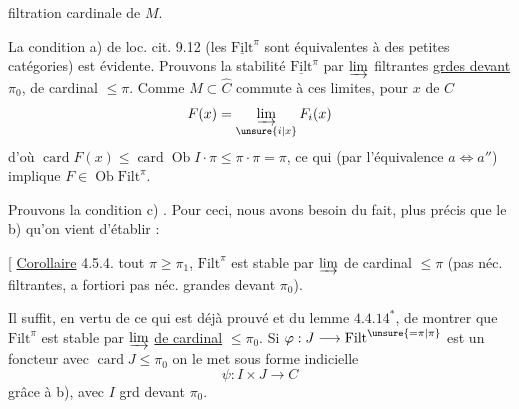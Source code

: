 filtration cardinale de $M$.

La condition a) de loc. cit. 9.12 (les $\underline{\mathrm{Filt}}^\pi$ sont équivalentes à des petites catégories) est évidente. Prouvons  la stabilité  $\underline{\mathrm{Filt}}^\pi$ par $\varinjlim$ filtrantes  \uline{grdes devant $\pi_0$}, de cardinal $\leq\pi$.
Comme $M\subset \widehat C$  commute à ces limites,  pour $x$ de $C$
\[ F(x)=\varinjlim_{\unsure{i|x}} F_i(x) \]
d'où $\operatorname{card}F(x)\leq\operatorname{card}\operatorname{Ob} I\cdot\pi\leq\pi\cdot\pi=\pi$, ce qui (par l'équivalence $a\Longleftrightarrow a''$) implique $F\in\operatorname{Ob}\mathrm{Filt}^\pi$.

Prouvons la condition c) . Pour ceci, nous avons besoin du fait,  plus précis que le b) qu'on vient d'établir :

[ \uline{Corollaire} 4.5.4.   tout $\pi\geq\pi_1$, $\mathrm{Filt}^\pi$  est stable par $\varinjlim$ de cardinal $\leq\pi$ (pas néc. filtrantes, a fortiori pas néc. grandes devant $\pi_0$).

Il suffit,  en vertu de ce qui est déjà prouvé et du lemme $4.4.14^{\ast}$, de montrer que $\mathrm{Filt}^\pi$ est stable par $\varinjlim$ \uline{de cardinal} $\leq\pi_0$.
Si $\varphi:J\longrightarrow\mathrm{Filt}^{\unsure{=\pi|\pi}}$ est un foncteur avec $\operatorname{card}J\leq\pi_0$ on le met sous forme indicielle
\[ \psi:I\times J\longrightarrow C \]
grâce à  b), avec $I$ grd devant $\pi_0$.
